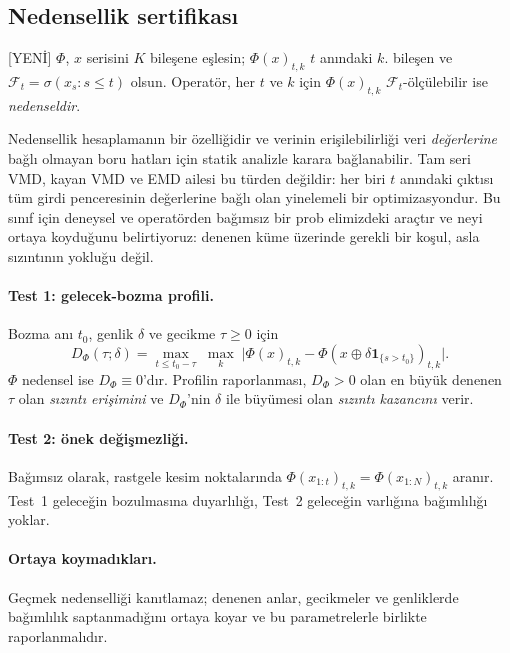 \documentclass[11pt,a4paper]{article}
\begin{document}
\subsection{Nedensellik sertifikası}
\textsf{[YENİ]} $\Phi$, $x$ serisini $K$ bileşene eşlesin;
$\Phi(x)_{t,k}$ $t$ anındaki $k$. bileşen ve
$\mathcal F_t=\sigma(x_s: s\le t)$ olsun. Operatör, her $t$ ve $k$ için
$\Phi(x)_{t,k}$ $\mathcal F_t$-ölçülebilir ise \emph{nedenseldir}.

Nedensellik hesaplamanın bir özelliğidir ve verinin erişilebilirliği veri
\emph{değerlerine} bağlı olmayan boru hatları için statik analizle karara
bağlanabilir. Tam seri VMD, kayan VMD ve EMD ailesi bu türden değildir: her biri
$t$ anındaki çıktısı tüm girdi penceresinin değerlerine bağlı olan yinelemeli
bir optimizasyondur. Bu sınıf için deneysel ve operatörden bağımsız bir prob
elimizdeki araçtır ve neyi ortaya koyduğunu belirtiyoruz: denenen küme üzerinde
gerekli bir koşul, asla sızıntının yokluğu değil.

\paragraph{Test 1: gelecek-bozma profili.}
Bozma anı $t_0$, genlik $\delta$ ve gecikme $\tau\ge0$ için
\begin{equation}
D_\Phi(\tau;\delta)=
\max_{t\le t_0-\tau}\;\max_k\;
\bigl|\Phi(x)_{t,k}-\Phi\!\left(x\oplus\delta\mathbf 1_{\{s>t_0\}}\right)_{t,k}\bigr| .
\end{equation}
$\Phi$ nedensel ise $D_\Phi\equiv0$'dır. Profilin raporlanması, $D_\Phi>0$ olan
en büyük denenen $\tau$ olan \emph{sızıntı erişimini} ve $D_\Phi$'nin $\delta$
ile büyümesi olan \emph{sızıntı kazancını} verir.

\paragraph{Test 2: önek değişmezliği.}
Bağımsız olarak, rastgele kesim noktalarında
$\Phi(x_{1:t})_{t,k}=\Phi(x_{1:N})_{t,k}$ aranır. Test~1 geleceğin bozulmasına
duyarlılığı, Test~2 geleceğin varlığına bağımlılığı yoklar.

\paragraph{Ortaya koymadıkları.} Geçmek nedenselliği kanıtlamaz; denenen anlar,
gecikmeler ve genliklerde bağımlılık saptanmadığını ortaya koyar ve bu
parametrelerle birlikte raporlanmalıdır.
\end{document}
